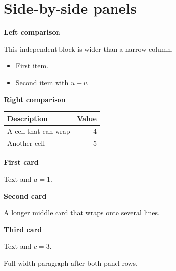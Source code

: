 \documentclass[11pt,a4paper]{article}
\begin{document}
\section{Side-by-side panels}
\noindent
\begin{minipage}[t]{0.46\linewidth}
\textbf{Left comparison}\par
This independent block is wider than a narrow column.
\begin{itemize}\item First item.\item Second item with \(u+v\).\end{itemize}
\end{minipage}\hfill
\begin{minipage}[t]{0.46\linewidth}
\textbf{Right comparison}\par
\begin{tabularx}{\linewidth}{Xr}\toprule Description & Value\\\midrule A cell that can wrap & 4\\Another cell & 5\\\bottomrule\end{tabularx}
\end{minipage}
\par\bigskip\noindent
\begin{minipage}[t]{0.30\linewidth}
\textbf{First card}\par Text and \(a=1\).
\end{minipage}\hspace{0.05\linewidth}%
\begin{minipage}[t]{0.30\linewidth}
\textbf{Second card}\par A longer middle card that wraps onto several lines.
\end{minipage}\hspace{0.05\linewidth}%
\begin{minipage}[t]{0.30\linewidth}
\textbf{Third card}\par Text and \(c=3\).
\end{minipage}
\par\bigskip
Full-width paragraph after both panel rows.
\clearpage
\end{document}
